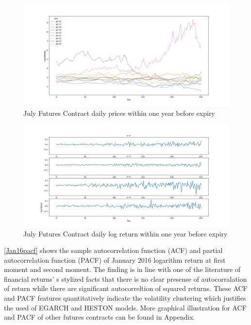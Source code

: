 \documentclass[12pt,a4paper]{article}
\newcommand\colorAutoref[1]{{\hypersetup{linkcolor=black}\autoref{#1}}}
\numberwithin{equation}{section}
\begin{document}
\begin{figure}[h!] 
\includegraphics[scale=1,width=1\linewidth,height=0.4\textheight]{Jul_price.png}
\caption{July Futures Contract daily prices within one year before expiry}
\label{JulPrice}
\end{figure}
\begin{figure}[h!] 
\includegraphics[scale=1,width=1\linewidth,height=0.4\textheight]{Jul_vol.png}
\caption{July Futures Contract daily log return within one year before expiry}
\label{JulVol}
\end{figure}

\colorAutoref{Jan16pacf} shows the sample autocorrelation function (ACF) and partial autocorrelation function (PACF) of January 2016 logarithm return at first moment and second moment. The finding is in line with one of the literature of financial returns' s stylized facts that there is no clear presense of autocorralation of return while there are significant autocorreltion of squared returns. These ACF and PACF features quantitatively indicate the volatility clustering which justifies the used of EGARCH and HESTON models. More graphical illustration for ACF and PACF of other futures contracts can be found in Appendix.
\end{document}
